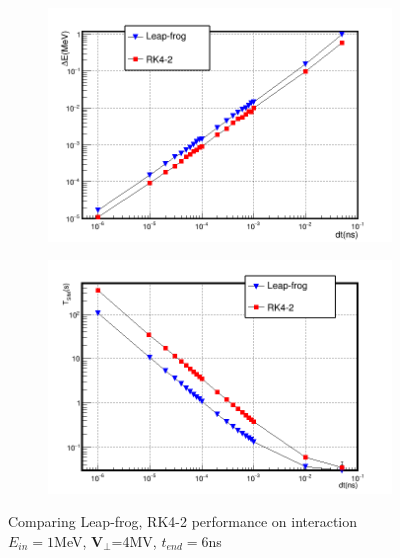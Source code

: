 \documentclass{book}
\begin{document}
\begin{figure}[H]
    \captionsetup[subfigure]{justification=centering}
    \captionsetup{justification=centering}
    \centering
    \begin{subfigure}{0.9\textwidth}
        \centering
        \includegraphics[width=\linewidth]{../../../figures/analiz/90staticE_lf_rk2_dt-E_3.png}
    \end{subfigure}
    
    \begin{subfigure}{0.9\textwidth}
        \centering
        \includegraphics[width=\linewidth]{../../../figures/analiz/90staticE_lf_rk2_dt-Tsim.png}
    \end{subfigure}
    \caption{Comparing Leap-frog, RK4-2 performance on \eE interaction\\ $E_{in}=1$MeV, $\textbf{V}_{\perp}$=4MV, $t_{end}=6$ns}
    \label{fig:lf_rk2_perp_stat_E_comparison}
\end{figure}
\end{document}

